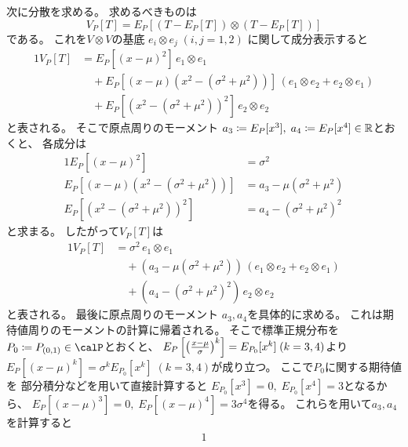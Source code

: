 \documentclass[report]{jlreq}
\begin{document}
\begin{example}[正規分布族の十分統計量の期待値と分散]
    次に分散を求める。
    求めるべきものは
    \begin{equation}
        V_P[T]
            = E_P[(T - E_P[T]) \otimes (T - E_P[T])]
    \end{equation}
    である。
    これを$V \otimes V$の基底
    $e_i \otimes e_j \; (i, j = 1, 2)$
    に関して成分表示すると
    \begin{alignat}{1}
        V_P[T]
            &=
                E_P[(x - \mu)^2] \, e_1 \otimes e_1 \\
            &\quad +
                E_P[(x - \mu)(x^2 - (\sigma^2 + \mu^2))] \,
                (e_1 \otimes e_2 + e_2 \otimes e_1) \\
            &\quad +
                E_P[(x^2 - (\sigma^2 + \mu^2))^2] \, e_2 \otimes e_2
    \end{alignat}
    と表される。
    そこで原点周りのモーメント
    $a_3 \coloneqq E_P[x^3], \; a_4 \coloneqq E_P[x^4] \in \mathbb{R}$とおくと、
    各成分は
    \begin{alignat}{1}
        E_P[(x - \mu)^2]
            &= \sigma^2 \\
        E_P[(x - \mu)(x^2 - (\sigma^2 + \mu^2))]
            &= a_3 - \mu (\sigma^2 + \mu^2) \\
        E_P[(x^2 - (\sigma^2 + \mu^2))^2]
            &= a_4 - (\sigma^2 + \mu^2)^2
    \end{alignat}
    と求まる。
    したがって$V_P[T]$は
    \begin{alignat}{1}
        V_P[T]
            &= \sigma^2 \, e_1 \otimes e_1 \\
            &\quad +
                (a_3 - \mu (\sigma^2 + \mu^2)) \,
                (e_1 \otimes e_2 + e_2 \otimes e_1) \\
            &\quad +
                (a_4 - (\sigma^2 + \mu^2)^2) \, e_2 \otimes e_2
    \end{alignat}
    と表される。
    最後に原点周りのモーメント
    $a_3, a_4$を具体的に求める。
    これは期待値周りのモーメントの計算に帰着される。
    そこで標準正規分布を$P_0 \coloneqq P_{(0, 1)} \in \calP$とおくと、
    $E_P\left[{\left({
        \frac{x - \mu}{\sigma}
    }\right)^k}\right] = E_{P_0}[x^k] \; (k = 3, 4)$より
    $E_P[(x - \mu)^k] = \sigma^k E_{P_0}[x^k] \; (k = 3, 4)$が成り立つ。
    ここで$P_0$に関する期待値を
    部分積分などを用いて直接計算すると
    $E_{P_0}[x^3] = 0, \; E_{P_0}[x^4] = 3$となるから、
    $E_P[(x - \mu)^3] = 0, \; E_P[(x - \mu)^4] = 3 \sigma^4$を得る。
    これらを用いて$a_3, a_4$を計算すると
    \begin{alignat}{1}

\end{alignat}
\end{example}
\end{document}
